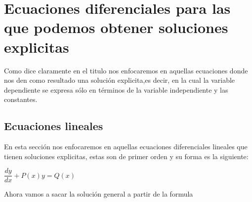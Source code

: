 \documentclass[10pt,a4paper]{article}
\begin{document}
\section{Ecuaciones diferenciales para las que podemos obtener soluciones explicitas} 
Como dice claramente en el titulo nos enfocaremos en aquellas ecuaciones donde nos den como resultado una solución explicita,es decir, en la cual la variable dependiente se expresa sólo en términos de la variable independiente y las constantes.
  
  \subsection{Ecuaciones lineales}
  
  En esta sección nos enfocaremos en aquellas ecuaciones diferenciales lineales que tienen soluciones explicitas, estas son de primer orden y su forma es la siguiente:\\
  \begin{center}
  $\dfrac{dy}{dx}+P(x)y=Q(x)$
  \end{center}
  Ahora vamos a sacar la solución general a partir de la formula 
\end{document}
